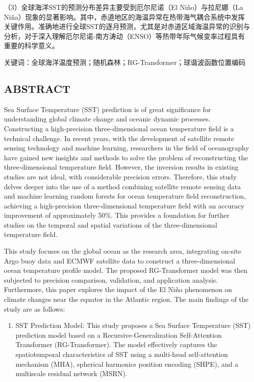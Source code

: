 \documentclass[
  12pt,
]{article}
\begin{document}
（3）全球海洋SST的预测分布差异主要受到厄尔尼诺（El Niño）与拉尼娜（La
Niña）现象的显著影响。其中，赤道地区的海温异常在热带海气耦合系统中发挥关键作用。准确地进行全球SST的逐月预测，尤其是对赤道区域海温异常的识别与分析，对于深入理解厄尔尼诺-南方涛动（ENSO）等热带年际气候变率过程具有重要的科学意义。

关键词：全球海洋温度预测；随机森林；RG-Transformer；球谐波函数位置编码

\subsection{ABSTRACT}\label{abstract}

Sea Surface Temperature (SST) prediction is of great significance for
understanding global climate change and oceanic dynamic processes.
Constructing a high-precision three-dimensional ocean temperature field
is a technical challenge. In recent years, with the development of
satellite remote sensing technology and machine learning, researchers in
the field of oceanography have gained new insights and methods to solve
the problem of reconstructing the three-dimensional temperature field.
However, the inversion results in existing studies are not ideal, with
considerable precision errors. Therefore, this study delves deeper into
the use of a method combining satellite remote sensing data and machine
learning random forests for ocean temperature field reconstruction,
achieving a high-precision three-dimensional temperature field with an
accuracy improvement of approximately 50\%. This provides a foundation
for further studies on the temporal and spatial variations of the
three-dimensional temperature field.

This study focuses on the global ocean as the research area, integrating
on-site Argo buoy data and ECMWF satellite data to construct a
three-dimensional ocean temperature profile model. The proposed
RG-Transformer model was then subjected to precision comparison,
validation, and application analysis. Furthermore, this paper explores
the impact of the El Niño phenomenon on climate changes near the equator
in the Atlantic region. The main findings of the study are as follows:

\begin{enumerate}
\def\labelenumi{(\arabic{enumi})}
\item
  SST Prediction Model: This study proposes a Sea Surface Temperature
  (SST) prediction model based on a Recursive-Generalization
  Self-Attention Transformer (RG-Transformer). The model effectively
  captures the spatiotemporal characteristics of SST using a multi-head
  self-attention mechanism (MHA), spherical harmonics position encoding
  (SHPE), and a multiscale residual network (MSRN).
\end{enumerate}
\end{document}
